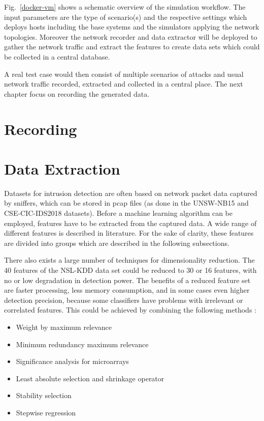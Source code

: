 \documentclass[conference]{IEEEtran}
\begin{document}
Fig.~\ref{docker-vm} shows a schematic overview of the simulation workflow. The input parameters are the type of scenario(s) and the respective settings which deploys hosts including the base systems and the simulators applying the network topologies. Moreover the network recorder and data extractor will be deployed to gather the network traffic and extract the features to create data sets which could be collected in a central database.

A real test case would then consist of multiple scenarios of attacks and usual network traffic recorded, extracted and collected in a central place. The next chapter focus on recording the generated data.

\section{Recording}

\section{Data Extraction}

Datasets for intrusion detection are often based on network packet data captured by sniffers, which can be stored in pcap files (as done in the UNSW-NB15 \cite{Nb2015} and CSE-CIC-IDS2018 \cite{Ids2018} datasets). Before a machine learning algorithm can be employed, features have to be extracted from the captured data. A wide range of different features is described in literature. For the sake of clarity, these features are divided into groups which are described in the following subsections.

There also exists a large number of techniques for dimensionality reduction. The 40 features of the NSL-KDD data set could be reduced to 30 or 16 features, with no or low degradation in detection power. The benefits of a reduced feature set are faster processing, less memory consumption, and in some cases even higher detection precision, because some classifiers have problems with irrelevant or correlated features. This could be achieved by combining the following methods \cite{vasquez2014}:
\begin{itemize}
	\item Weight by maximum relevance
	\item Minimum redundancy maximum relevance
	\item Significance analysis for microarrays
	\item Least absolute selection and shrinkage operator
	\item Stability selection
	\item Stepwise regression
\end{itemize}
\end{document}
